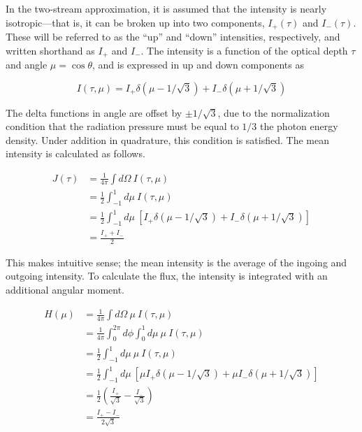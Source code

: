 \documentclass[onecolumn]{aastex63}
\begin{document}
In the two-stream approximation, it is assumed that the intensity is nearly isotropic---that is, it can be broken up into two components, $I_+(\tau)$ and $I_-(\tau)$. These will be referred to as the ``up'' and ``down'' intensities, respectively, and written shorthand as $I_+$ and $I_-$. The intensity is a function of the optical depth $\tau$ and angle $\mu = \cos{\theta}$, and is expressed in up and down components as

\begin{equation}
    I(\tau, \mu) = I_+ \delta(\mu - 1/\sqrt{3}) + I_- \delta(\mu + 1/\sqrt{3})
\end{equation}

The delta functions in angle are offset by $\pm 1/\sqrt{3}$, due to the normalization condition that the radiation pressure must be equal to $1/3$ the photon energy density. Under addition in quadrature, this condition is satisfied. The mean intensity is calculated as follows.

\begin{equation}
    \begin{split}
    J(\tau) &= \frac{1}{4\pi}\int d\Omega\ I(\tau, \mu)\\ 
    &= \frac{1}{2}\int_{-1}^1 d\mu\ I(\tau, \mu)\\
    &= \frac{1}{2}\int_{-1}^1 d\mu\ \left[I_+ \delta(\mu - 1/\sqrt{3}) + I_- \delta(\mu + 1/\sqrt{3})\right]\\
    &= \frac{I_+ + I_-}{2}
    \end{split}
\end{equation}

This makes intuitive sense; the mean intensity is the average of the ingoing and outgoing intensity. To calculate the flux, the intensity is integrated with an additional angular moment.


\begin{equation}
    \begin{split}
        H(\mu) &= \frac{1}{4\pi}\int d\Omega\ \mu\ I(\tau, \mu)\\
        &= \frac{1}{4\pi}\int_0^{2\pi} d\phi \int_0^1 d\mu\ \mu\ I(\tau, \mu)\\
        &= \frac{1}{2} \int_{-1}^1 d\mu\ \mu\ I(\tau, \mu)\\
        &= \frac{1}{2} \int_{-1}^1 d\mu\ \left[\mu I_+ \delta(\mu - 1/\sqrt{3}) + \mu I_- \delta(\mu + 1/\sqrt{3})\right]\\
        &= \frac{1}{2} \left( \frac{I_+}{\sqrt{3}} - \frac{I_-}{\sqrt{3}}\right) \\
        &= \frac{I_+ - I_-}{2\sqrt{3}}
    \end{split}
\end{equation}
\end{document}
